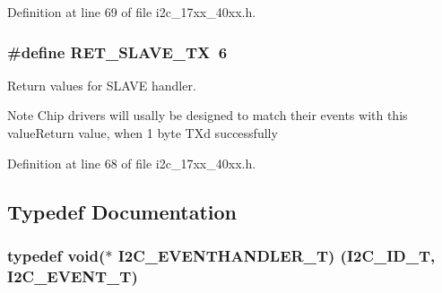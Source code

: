 Definition at line 69 of file i2c\+\_\+17xx\+\_\+40xx.\+h.

\subsubsection[{\texorpdfstring{R\+E\+T\+\_\+\+S\+L\+A\+V\+E\+\_\+\+TX}{RET_SLAVE_TX}}]{\setlength{\rightskip}{0pt plus 5cm}\#define R\+E\+T\+\_\+\+S\+L\+A\+V\+E\+\_\+\+TX~6}\hypertarget{group__I2C__17XX__40XX_ga49da135773ab760dbf75fcbcdb383623}{}\label{group__I2C__17XX__40XX_ga49da135773ab760dbf75fcbcdb383623}


Return values for S\+L\+A\+VE handler. 

\begin{DoxyNote}{Note}
Chip drivers will usally be designed to match their events with this value\+Return value, when 1 byte TX\textquotesingle{}d successfully 
\end{DoxyNote}


Definition at line 68 of file i2c\+\_\+17xx\+\_\+40xx.\+h.



\subsection{Typedef Documentation}
\subsubsection[{\texorpdfstring{I2\+C\+\_\+\+E\+V\+E\+N\+T\+H\+A\+N\+D\+L\+E\+R\+\_\+T}{I2C_EVENTHANDLER_T}}]{\setlength{\rightskip}{0pt plus 5cm}typedef void($\ast$ I2\+C\+\_\+\+E\+V\+E\+N\+T\+H\+A\+N\+D\+L\+E\+R\+\_\+T) ({\bf I2\+C\+\_\+\+I\+D\+\_\+T}, {\bf I2\+C\+\_\+\+E\+V\+E\+N\+T\+\_\+T})}\hypertarget{group__I2C__17XX__40XX_gaef152f4dc1487d90573810007489082e}{}\label{group__I2C__17XX__40XX_gaef152f4dc1487d90573810007489082e}


